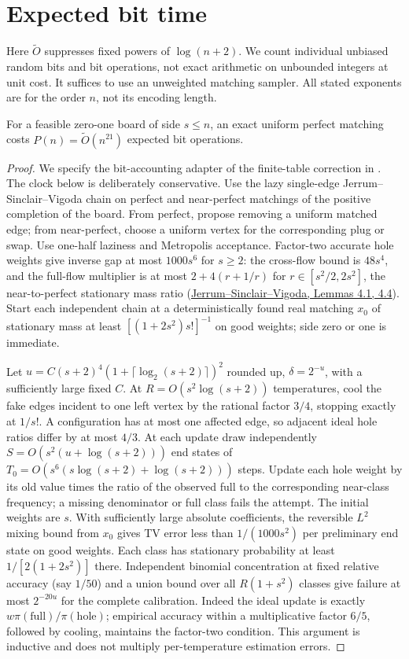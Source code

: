 \section{Expected bit time}\label{sec:bit-runtime}
Here $\widetilde O$ suppresses fixed powers of $\log(n+2)$.  We count
individual unbiased random bits and bit operations, not exact arithmetic on
unbounded integers at unit cost.  It suffices to use an unweighted matching
sampler.  All stated exponents are for the order $n$, not its encoding length.

\begin{lemma}\label{lem:pmclock-v2}
For a feasible zero-one board of side $s\le n$, an exact uniform
perfect matching costs $P(n)=\widetilde O(n^{21})$ expected bit operations.
\end{lemma}
\begin{proof}
We specify the bit-accounting adapter of the finite-table correction in
\cite[Sec.~6]{GLMP}.  The clock below is deliberately conservative.  Use
the lazy single-edge Jerrum--Sinclair--Vigoda chain on perfect and
near-perfect matchings of the positive completion of the board.
From perfect, propose removing a uniform matched edge; from near-perfect,
choose a uniform vertex for the corresponding plug or swap.  Use one-half
laziness and Metropolis acceptance.  Factor-two accurate hole weights
give inverse gap at most $1000s^6$ for $s\ge2$: the cross-flow bound
is $48s^4$, and the full-flow multiplier is at most $2+4(r+1/r)$ for
$r\in[s^2/2,2s^2]$, the near-to-perfect stationary mass ratio
(\href{https://www.math.cmu.edu/~af1p/Teaching/Markov_Chain_Mixing/Papers/permanent.pdf}{Jerrum--Sinclair--Vigoda,
Lemmas 4.1, 4.4}). Start each independent chain at a deterministically
found real matching $x_0$ of stationary mass at least
$[(1+2s^2)s!]^{-1}$ on good weights; side zero or one is immediate.

Let $u=C(s+2)^4(1+\lceil\log_2(s+2)\rceil)^2$ rounded up,
$\delta=2^{-u}$, with a sufficiently large fixed $C$.
At $R=O(s^2\log(s+2))$ temperatures, cool the fake edges incident to one
left vertex by the rational factor $3/4$, stopping exactly at $1/s!$.
A configuration has at most one affected edge, so adjacent ideal hole
ratios differ by at most $4/3$. At each update draw independently
$S=O(s^2(u+\log(s+2)))$ end states of
$T_0=O(s^6(s\log(s+2)+\log(s+2)))$ steps. Update each hole weight
by its old value times the ratio of the observed full to the corresponding
near-class frequency; a missing denominator or full class fails the attempt.
The initial weights are $s$.  With sufficiently large absolute coefficients,
the reversible $L^2$ mixing bound from $x_0$ gives TV error less than
$1/(1000s^2)$ per preliminary end state on good weights.  Each class
has stationary probability at least $1/[2(1+2s^2)]$ there. Independent
binomial concentration at fixed relative accuracy (say $1/50$) and a
union bound over all $R(1+s^2)$ classes give failure at most $2^{-20u}$
for the complete calibration. Indeed the ideal update is exactly
$w\pi(\mathrm{full})/\pi(\mathrm{hole})$; empirical accuracy within
a multiplicative factor $6/5$, followed by cooling, maintains the
factor-two condition.  This argument is inductive and does not multiply
per-temperature estimation errors.


\end{proof}
